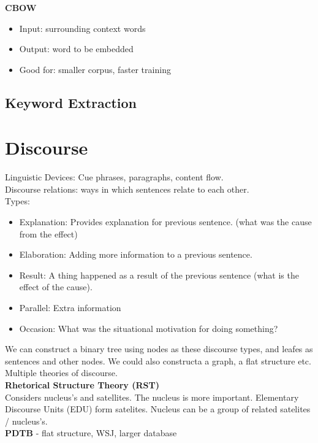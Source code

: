 \documentclass[]{article}
\begin{document}
     
     \textbf{CBOW}
     \begin{itemize}
      \item Input: surrounding context words
      \item Output: word to be embedded
      \item Good for: smaller corpus, faster training
     \end{itemize}
    
    \subsection{Keyword Extraction}
    
   
    \clearpage
	\section{Discourse}
	Linguistic Devices: Cue phrases, paragraphs, content flow. \\
	Discourse relations: ways in which sentences relate to each other. \\
	Types: 
	\begin{itemize}
	 \item Explanation: Provides explanation for previous sentence. (what was the cause from the effect)
	 \item Elaboration: Adding more information to a previous sentence. 
	 \item Result: A thing happened as a result of the previous sentence (what is the effect of the cause).
	 \item Parallel: Extra information  
	 \item Occasion: What was the situational motivation for doing something?
	\end{itemize}
	
	We can construct a binary tree using nodes as these discourse types, and leafes as sentences and other nodes. We could also constructa a graph, a flat structure etc. Multiple theories of discourse. \\
	
	\textbf{Rhetorical Structure Theory (RST)} \\
	Considers nucleus's and satellites. The nucleus is more important.
	Elementary Discourse Units (EDU) form satelites. Nucleus can be a group of related satelites / nucleus's. \\ 
	
	\textbf{PDTB} - flat structure, WSJ, larger database

	
	
	\clearpage
	
	
	
\end{document}
